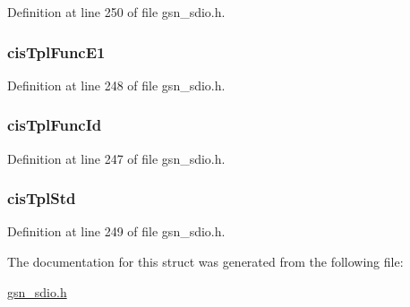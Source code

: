 Definition at line 250 of file gsn\_\-sdio.h.

\hypertarget{a00218_adf00628b0e4d779c9c1fb7b24002cf69}{
\subsubsection[{cisTplFuncE1}]{ {\bf cisTplFuncE1}}}
\label{a00218_adf00628b0e4d779c9c1fb7b24002cf69}


Definition at line 248 of file gsn\_\-sdio.h.

\hypertarget{a00218_a0ab47728bbe9b5f06828d5c1d110fb15}{
\subsubsection[{cisTplFuncId}]{ {\bf cisTplFuncId}}}
\label{a00218_a0ab47728bbe9b5f06828d5c1d110fb15}


Definition at line 247 of file gsn\_\-sdio.h.

\hypertarget{a00218_adff68410d180af6eb7daf71634354b8f}{
\subsubsection[{cisTplStd}]{ {\bf cisTplStd}}}
\label{a00218_adff68410d180af6eb7daf71634354b8f}


Definition at line 249 of file gsn\_\-sdio.h.



The documentation for this struct was generated from the following file:\begin{DoxyCompactItemize}
\item 
\hyperlink{a00584}{gsn\_\-sdio.h}\end{DoxyCompactItemize}
